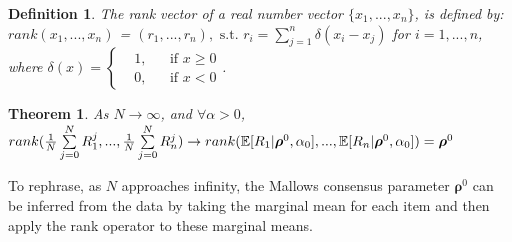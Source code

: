 \documentclass[11pt, oneside]{article}   	%
\newtheorem{theorem}{Theorem}[subsection]
\newtheorem{mydef}{Definition}
\begin{document}
\begin{mydef}
The rank vector of a real number vector $\{x_1, ..., x_n \}$, is defined by:\\

	$rank(x_1, ..., x_n)$ = $(r_1,..., r_n), \text{ s.t. } r_i = \sum\limits_{j=1}^{n}\delta (x_i - x_j)$ for $i = 1, ..., n$, where $\delta(x) = \left \{
	\begin{aligned}
	&1, && \text{if } x\geq 0 \\
	&0, && \text{if } x < 0
	\end{aligned} \right.
	$.


\end{mydef} 
\begin{theorem}\label{theorem:inferrho}
As $N \rightarrow \infty$, and $\forall \alpha > 0$, \\ $rank({1\over N}\sum\limits_{j=0}^{N}R_1^j,...,{1\over N}\sum\limits_{j=0}^{N}R_n^j) \rightarrow rank(\mathbb{E}[{R}_1|\bm{\rho}^0, \alpha_0],...,\mathbb{E}[{R}_n|\bm{\rho}^0, \alpha_0]) =\bm{\rho}^0 $
\end{theorem}

To rephrase, as $N$ approaches infinity, the Mallows consensus parameter $\bm{\rho}^0$ can be inferred from the data by taking the marginal mean for each item and then apply the rank operator to these marginal means.
\end{document}
